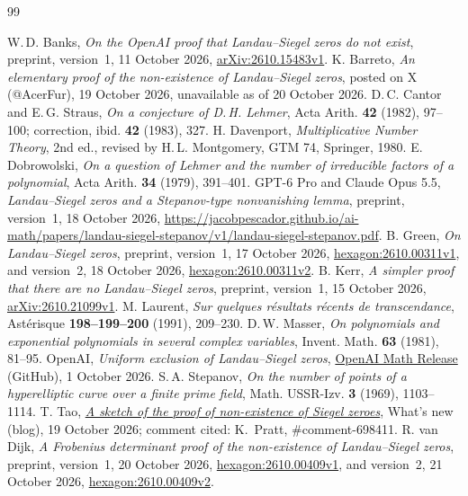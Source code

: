 \documentclass[11pt]{amsart}
\theoremstyle{remark}
\begin{document}
\begin{thebibliography}{99}\footnotesize\raggedright\setlength{\itemsep}{0pt}
 W.\,D. Banks, \emph{On the OpenAI proof that Landau--Siegel zeros do not exist},
preprint, version~1, 11 October 2026, \href{https://arxiv.org/abs/2610.15483v1}{arXiv:2610.15483v1}.
 K. Barreto, \emph{An elementary proof of the non-existence of Landau--Siegel
zeros}, posted on X (@AcerFur), 19 October 2026, unavailable as of 20 October 2026.
 D.\,C. Cantor and E.\,G. Straus, \emph{On a conjecture of D.\,H. Lehmer},
Acta Arith. \textbf{42} (1982), 97--100; correction, ibid. \textbf{42} (1983), 327.
 H. Davenport, \emph{Multiplicative Number Theory}, 2nd ed., revised by
H.\,L. Montgomery, GTM 74, Springer, 1980.
 E. Dobrowolski, \emph{On a question of Lehmer and the number of irreducible
factors of a polynomial}, Acta Arith. \textbf{34} (1979), 391--401.
 GPT-6 Pro and Claude Opus 5.5, \emph{Landau--Siegel zeros and a Stepanov-type
nonvanishing lemma}, preprint, version~1, 18 October 2026,
\url{https://jacobpescador.github.io/ai-math/papers/landau-siegel-stepanov/v1/landau-siegel-stepanov.pdf}.
 B. Green, \emph{On Landau--Siegel zeros}, preprint, version~1, 17 October 2026,
\href{https://hexagonmath.org/abs/2610.00311v1}{hexagon:2610.00311v1}, and version~2, 18 October 2026,
\href{https://hexagonmath.org/abs/2610.00311v2}{hexagon:2610.00311v2}.
 B. Kerr, \emph{A simpler proof that there are no Landau--Siegel zeros}, preprint,
version~1, 15 October 2026, \href{https://arxiv.org/abs/2610.21099v1}{arXiv:2610.21099v1}.
 M. Laurent, \emph{Sur quelques r\'esultats r\'ecents de transcendance},
Ast\'erisque \textbf{198--199--200} (1991), 209--230.
 D.\,W. Masser, \emph{On polynomials and exponential polynomials in several complex
variables}, Invent. Math. \textbf{63} (1981), 81--95.
 OpenAI, \emph{Uniform exclusion of Landau--Siegel zeros}, \href{https://github.com/openai/math/blob/adc7f1241b42e322a6451854ab7e4b4c146bf78a/preprints/Uniform-exclusion-of-Landau-Siegel-zeros-October-1-2026/paper.pdf}{OpenAI Math Release}
(GitHub), 1 October 2026.
 S.\,A. Stepanov, \emph{On the number of points of a hyperelliptic curve over a
finite prime field}, Math. USSR-Izv. \textbf{3} (1969), 1103--1114.
 T. Tao, \href{https://terrytao.wordpress.com/2026/10/19/a-sketch-of-the-proof-of-non-existence-of-siegel-zeroes/}{\emph{A sketch of the proof of non-existence of Siegel zeroes}}, What's new (blog), 19 October 2026; comment cited: K.~Pratt, \#comment-698411.
 R. van Dijk, \emph{A Frobenius determinant proof of the non-existence of
Landau--Siegel zeros}, preprint, version~1, 20 October 2026,
\href{https://hexagonmath.org/abs/2610.00409v1}{hexagon:2610.00409v1}, and version~2, 21 October 2026,
\href{https://hexagonmath.org/abs/2610.00409v2}{hexagon:2610.00409v2}.
\end{thebibliography}
\end{document}
